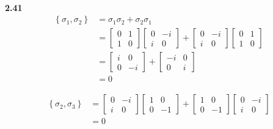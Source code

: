 \documentclass[10pt]{book}
\newcommand{\Textbf}[1]{\hspace{3mm}\\ \textbf{#1}\\}
\begin{document}
	\Textbf{2.41}
	\begin{equation}
\begin{aligned}
		\left\{\sigma_1, \sigma_2 \right\} &=\sigma_1 \sigma_2 + \sigma_2 \sigma_1\\
		&= \begin{bmatrix}
			0 & 1 \\
			1 & 0
		\end{bmatrix}
		\begin{bmatrix}
			0 & -i \\
			i & 0
		\end{bmatrix}
		+
		\begin{bmatrix}
			0 & -i \\
			i & 0
		\end{bmatrix}
		\begin{bmatrix}
			0 & 1 \\
			1 & 0
		\end{bmatrix} \\
		&=
		\begin{bmatrix}
			i & 0 \\
			0 & -i
		\end{bmatrix}
		+
		\begin{bmatrix}
			-i & 0 \\
			0 & i
		\end{bmatrix}\\
		&= 0
	\end{aligned}
\end{equation}
	
	
	
	\begin{equation}
\begin{aligned}
		\left\{\sigma_2, \sigma_3 \right\} &= \begin{bmatrix}
			0 & -i \\
			i & 0
		\end{bmatrix}
		\begin{bmatrix}
			1 & 0 \\
			0 & -1
		\end{bmatrix}
		+
		\begin{bmatrix}
			1 & 0 \\
			0 & -1
		\end{bmatrix}
		\begin{bmatrix}
			0 & -i \\
			i & 0
		\end{bmatrix}\\
		&=0
	\end{aligned}
\end{equation}
	
\end{document}
